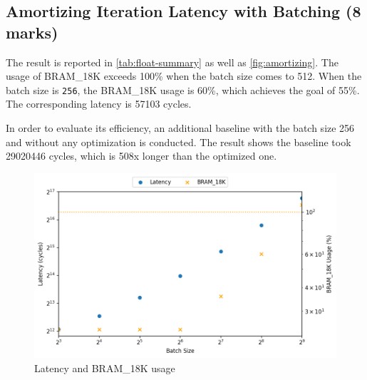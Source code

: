 \subsection{Amortizing Iteration Latency with Batching (8 marks)}
\label{sec:1d}


The result is reported in \autoref{tab:float-summary} as well as \autoref{fig:amortizing}.
The usage of BRAM\_18K exceeds 100\% when the batch size comes to 512.
When the batch size is \texttt{256}, the BRAM\_18K usage is 60\%, which achieves the goal of 55\%.
The corresponding latency is 57103 cycles.

In order to evaluate its efficiency, an additional baseline with the batch size 256 and without any optimization is conducted.
The result shows the baseline took 29020446 cycles, which is 508x longer than the optimized one.

\begin{figure}
    \centering
    \includegraphics[scale=0.64]{images/amortizing.png}
    \caption{Latency and BRAM\_18K usage}
    \label{fig:amortizing}
\end{figure}
